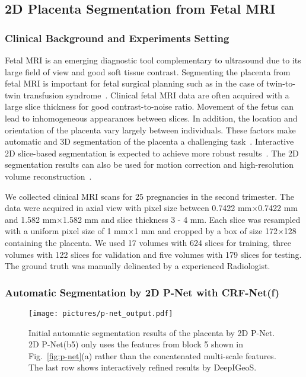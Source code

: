 \documentclass[10pt,journal,compsoc]{IEEEtran}
\begin{document}
\subsection{2D Placenta Segmentation from Fetal MRI}
\subsubsection{Clinical Background and Experiments Setting}
Fetal MRI is an emerging diagnostic tool complementary to ultrasound due to its large field of view and good soft tissue contrast. Segmenting the placenta from fetal MRI is important for fetal surgical planning such as in the case of twin-to-twin transfusion syndrome~\cite{Deprest2010}. Clinical fetal MRI data are often acquired with a large slice thickness for good contrast-to-noise ratio. Movement of the fetus can lead to inhomogeneous appearances between slices. In addition, the location and orientation of the placenta vary largely between individuals. These factors make automatic and 3D segmentation of the placenta a challenging task~\cite{Alansary2016}. Interactive 2D slice-based segmentation is expected to achieve more robust results~\cite{Wang2016, Wang2016a}. The 2D segmentation results can also be used for motion correction and high-resolution volume reconstruction~\cite{Keraudren2014}. 

We collected clinical MRI scans for 25 pregnancies in the second trimester. The data were acquired in axial view with pixel size between 0.7422 mm$\times$0.7422 mm and 1.582 mm$\times$1.582 mm and slice thickness 3 - 4 mm. Each slice was resampled with a uniform pixel size of 1 mm$\times$1 mm and cropped by a box of size 172$\times$128 containing the placenta. %
We used 17 volumes with 624 slices for training, three volumes with 122 slices for validation and five volumes with 179 slices for testing. The ground truth was manually delineated by a experienced Radiologist. 

\subsubsection{Automatic Segmentation by 2D P-Net with CRF-Net(f)}
\begin{figure}[t]
	\centering
	\texttt{[image: pictures/p-net\_output.pdf]}
	\caption[Initial automatic segmentation results of the placenta]{ 
		Initial automatic segmentation results of the placenta by 2D P-Net. 2D P-Net(b5) only uses the features from block 5 shown in Fig.~\ref{fig:p-net}(a) rather than the concatenated multi-scale features. The last row shows interactively refined results by DeepIGeoS.} 
	\label{fig:p-net_output}
\end{figure}
\end{document}
